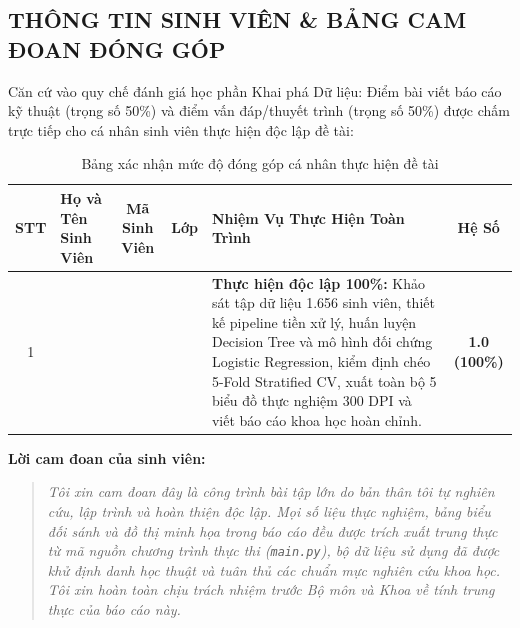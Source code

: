 \documentclass[12pt,a4paper]{article}
\begin{document}
\newpage
\thispagestyle{plain}
\begin{center}
    \section*{THÔNG TIN SINH VIÊN & BẢNG CAM ĐOAN ĐÓNG GÓP}
\end{center}

Căn cứ vào quy chế đánh giá học phần Khai phá Dữ liệu: Điểm bài viết báo cáo kỹ thuật (trọng số 50\%) và điểm vấn đáp/thuyết trình (trọng số 50\%) được chấm trực tiếp cho cá nhân sinh viên thực hiện độc lập đề tài:

\begin{table}[H]
\centering
\begin{tabularx}{\textwidth}{|c|X|c|c|X|c|}
\hline
\rowcolor{primaryblue}
\textbf{\color{white}STT} & \textbf{\color{white}Họ và Tên Sinh Viên} & \textbf{\color{white}Mã Sinh Viên} & \textbf{\color{white}Lớp} & \textbf{\color{white}Nhiệm Vụ Thực Hiện Toàn Trình} & \textbf{\color{white}Hệ Số} \\
\hline
1 & \dotfill & \dotfill & \dotfill & \textbf{Thực hiện độc lập 100\%:} Khảo sát tập dữ liệu 1.656 sinh viên, thiết kế pipeline tiền xử lý, huấn luyện Decision Tree và mô hình đối chứng Logistic Regression, kiểm định chéo 5-Fold Stratified CV, xuất toàn bộ 5 biểu đồ thực nghiệm 300 DPI và viết báo cáo khoa học hoàn chỉnh. & \textbf{1.0 (100\%)} \\
\hline
\end{tabularx}
\caption{Bảng xác nhận mức độ đóng góp cá nhân thực hiện đề tài}
\end{table}

\vspace{1.5cm}
\noindent\textbf{Lời cam đoan của sinh viên:}
\begin{quote}
\textit{Tôi xin cam đoan đây là công trình bài tập lớn do bản thân tôi tự nghiên cứu, lập trình và hoàn thiện độc lập. Mọi số liệu thực nghiệm, bảng biểu đối sánh và đồ thị minh họa trong báo cáo đều được trích xuất trung thực từ mã nguồn chương trình thực thi (\texttt{main.py}), bộ dữ liệu sử dụng đã được khử định danh học thuật và tuân thủ các chuẩn mực nghiên cứu khoa học. Tôi xin hoàn toàn chịu trách nhiệm trước Bộ môn và Khoa về tính trung thực của báo cáo này.}
\end{quote}
\end{document}
